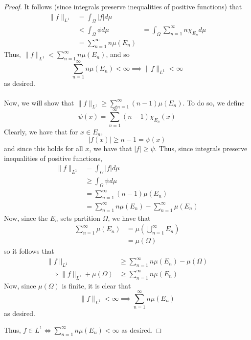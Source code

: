 \documentclass[fontsize=11pt]{scrartcl} %
\numberwithin{equation}{section} %
\numberwithin{figure}{section} %
\numberwithin{table}{section} %
\begin{document}
\begin{proof}
    It follows (since integrals preserve inequalities of positive functions)
    that
    \[
        \begin{aligned}
            \|f\|_{L^1} &= \int_{\Omega}|f|d\mu\\
                                &< \int_{\Omega}\phi d\mu
                                &=\int_{\Omega}\sum_{n=1}^{\infty}n\chi_{E_n}
                                d\mu\\
                                &=\sum_{n=1}^{\infty}n\mu(E_n)
        \end{aligned}
    \]
    Thus, $\|f\|_{L^1} < \sum_{n=1}^{\infty}n\mu(E_n)$, and so
    \[
        \sum_{n=1}^{\infty}n\mu(E_n) <\infty \implies \|f\|_{L^1}<\infty
    \]
    as desired.
    \\
    \\
    Now, we will show that $\|f\|_{L^1} \geq \sum_{n=1}^{\infty}(n-1)\mu(E_n)$.
    To do so, we define
    \[
        \psi(x) = \sum_{n=1}^{\infty}(n-1)\chi_{E_n}(x)
    \]
    Clearly, we have that for $x\in E_n$,
    \[
        |f(x)| \geq n-1 = \psi(x)
    \]
    and since this holds for all $x$, we have that $|f| \geq \psi$. Thus, since
    integrals preserve inequalities of positive functions,
    \[
        \begin{aligned}
            \|f\|_{L^1} &= \int_{\Omega}|f|d\mu\\
                        &\geq \int_{\Omega}\psi d\mu\\
                        &=\sum_{n=1}^{\infty}(n-1)\mu(E_n)\\
                        &=\sum_{n=1}^{\infty}n\mu(E_n) -
                        \sum_{n=1}^{\infty}\mu(E_n)
        \end{aligned}
    \]
    Now, since the $E_n$ sets partition $\Omega$, we have that
    \[
        \begin{aligned}
            \sum_{n=1}^{\infty}\mu(E_n) &=
            \mu\left(\bigcup_{n=1}^{\infty}E_n\right)\\
            &=\mu(\Omega)
        \end{aligned}
    \]
    so it follows that
    \[
        \begin{aligned}
            \|f\|_{L^1} &\geq \sum_{n=1}^{\infty}n\mu(E_n) - \mu(\Omega)\\
            \implies \|f\|_{L^1}+\mu(\Omega) &\geq \sum_{n=1}^{\infty}n\mu(E_n)
        \end{aligned}
    \]
    Now, since $\mu(\Omega)$ is finite, it is clear that
    \[
        \|f\|_{L^1} < \infty \implies \sum_{n=1}^{\infty}n\mu(E_n)
    \]
    as desired.

    Thus, $f\in L^1 \iff \sum_{n=1}^{\infty}n\mu(E_n) < \infty$ as desired.
\end{proof}
\end{document}
